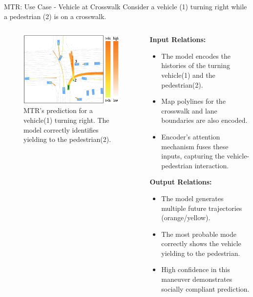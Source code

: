 \documentclass[10pt,aspectratio=169]{beamer}
\begin{document}
\begin{frame}{MTR: Use Case - Vehicle at Crosswalk}
    Consider a vehicle (1) turning right while a pedestrian (2) is on a crosswalk.
    \begin{columns}[T]
        \begin{column}{0.5\textwidth}
            \begin{figure}
                \centering
                \includegraphics[width=\textwidth]{docs/latex/figures/input_output_viz_crosswalk_detail.png}
                \caption{MTR's prediction for a vehicle(1) turning right. The model correctly identifies yielding to the pedestrian(2)\cite{Shi2022MTR}.}
            \end{figure}
        \end{column}
        \begin{column}{0.5\textwidth}
            \textbf{Input Relations:}
            \begin{itemize}
                \item The model encodes the histories of the turning vehicle(1) and the pedestrian(2).
                \item Map polylines for the crosswalk and lane boundaries are also encoded.
                \item Encoder's attention mechanism fuses these inputs, capturing the vehicle-pedestrian interaction.
            \end{itemize}
            \textbf{Output Relations:}
            \begin{itemize}
                \item The model generates multiple future trajectories (orange/yellow).
                \item The most probable mode correctly shows the vehicle yielding to the pedestrian.
                \item High confidence in this maneuver demonstrates socially compliant prediction.
            \end{itemize}
        \end{column}
    \end{columns}
\end{frame}
\end{document}
